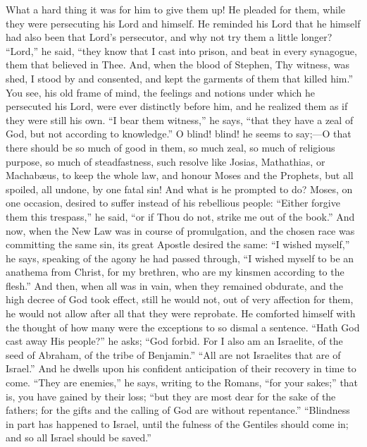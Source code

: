 What a hard thing it was for him to give them up! He
pleaded for them, while they were persecuting his Lord
and himself. He reminded his Lord that he himself had
also been that Lord's persecutor, and why not try them a
little longer? ``Lord,'' he said, ``they know
that I cast into prison, and beat in every synagogue,
them that believed in Thee. And, when the blood of
Stephen, Thy witness, was shed, I stood by and consented,
and kept the garments of them that killed him.'' You
see, his old frame of mind, the feelings and notions
under which he persecuted his Lord, were ever distinctly
before him, and he realized them as if they were still
his own. ``I bear them witness,'' he says,
``that they have a zeal of God, but not according to
knowledge.'' O blind! blind! he seems to say;—O
that there should be so much of good in them, so much
zeal, so much of religious purpose, so much of
steadfastness, such resolve like Josias, Mathathias, or Machabæus, to keep the whole law, and honour Moses and
the Prophets, but all spoiled, all undone, by one fatal
sin! And what is he prompted to do? Moses, on one
occasion, desired to suffer instead of his rebellious
people: ``Either forgive them this trespass,'' he
said, ``or if Thou do not, strike me out of the
book.'' And now, when the New Law was in course of
promulgation, and the chosen race was committing the same
sin, its great Apostle desired the same: ``I wished
myself,'' he says, speaking of the agony he had
passed through, ``I wished myself to be an anathema
from Christ, for my brethren, who are my kinsmen
according to the flesh.'' And then, when all was in
vain, when they remained obdurate, and the high decree of
God took effect, still he would not, out of very
affection for them, he would not allow after all that
they were reprobate. He comforted himself with the
thought of how many were the exceptions to so dismal a
sentence. ``Hath God cast away His people?'' he
asks; ``God forbid. For I also am an Israelite, of
the seed of Abraham, of the tribe of Benjamin.''
``All are not Israelites that are of Israel.''
And he dwells upon his confident anticipation of their
recovery in time to come. ``They are enemies,''
he says, writing to the Romans, ``for your
sakes;'' that is, you have gained by their loss;
``but they are most dear for the sake of the fathers;
for the gifts and the calling of God are without
repentance.'' ``Blindness in part has happened to
Israel, until the fulness of the Gentiles should come in;
and so all Israel should be saved.''

